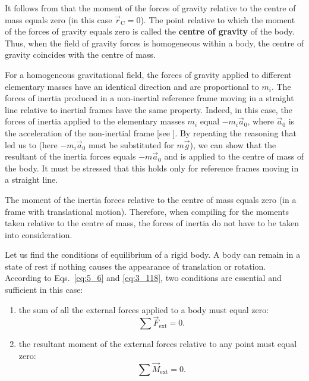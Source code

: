 It follows from  that the moment of the forces of gravity relative to the centre of mass equals zero (in this case $\vec{r}_{\text{C}}=0$). The point relative to which the moment of the forces of gravity equals zero is called the \textbf{centre of gravity} of the body. Thus, when the field of gravity forces is homogeneous within a body, the centre of gravity coincides with the centre of mass.

For a homogeneous gravitational field, the forces of gravity applied to different elementary masses have an identical direction and are proportional to $m_i$. The forces of inertia produced in a non-inertial reference frame moving in a straight line relative to inertial frames have the same property. Indeed, in this case, the forces of inertia applied to the elementary masses $m_i$ equal $-m_i\vec{a}_0$, where $\vec{a}_0$ is the acceleration of the non-inertial frame [see ]. By repeating the reasoning that led us to  (here $-m_i\vec{a}_0$ must be substituted for $m\vec{g}$), we can show that the resultant of the inertia forces equals $-m\vec{a}_0$ and is applied to the centre of mass of the body. It must be stressed that this holds only for reference frames moving in a straight line.

The moment of the inertia forces relative to the centre of mass equals zero (in a frame with translational motion). Therefore, when compiling  for the moments taken relative to the centre of mass, the forces of inertia do not have to be taken into consideration.

Let us find the conditions of equilibrium of a rigid body. A body can remain in a state of rest if nothing causes the appearance of translation or rotation. According to Eqs.~\eqref{eq:5_6} and \eqref{eq:3_118}, two conditions are essential and sufficient in this case:
\begin{enumerate}[(1)]
	\item the sum of all the external forces applied to a body must equal zero:
	\begin{equation}\label{eq:5_57}
		\sum\vec{F}_{\text{ext}} = 0.
	\end{equation}

	\item the resultant moment of the external forces relative to any point must equal zero:
	\begin{equation}\label{eq:5_58}
		\sum\vec{M}_{\text{ext}} = 0.
	\end{equation}
\end{enumerate}

